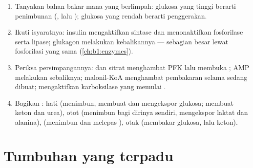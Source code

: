 \begin{method}\label{met:b1:biosyntheses-integration:state}
\begin{enumerate}
  \item Tanyakan bahan bakar mana yang berlimpah: glukosa yang tinggi
        berarti penimbunan (, lalu ); glukosa yang rendah
        berarti penggerakan.
  \item Ikuti isyaratnya: insulin mengaktifkan sintase dan
        menonaktifkan fosforilase serta lipase; glukagon melakukan
        kebalikannya --- sebagian besar lewat fosforilasi  yang sama
        (\cref{ch:b1:enzymes}).
  \item Periksa persimpangannya:  dan sitrat menghambat PFK lalu
        membuka ; AMP melakukan sebaliknya; malonil-KoA
        menghambat pembakaran  selama  sedang dibuat;
         mengaktifkan karboksilase yang memulai
        .
  \item Bagikan : hati (menimbun, membuat dan mengekspor
        glukosa; membuat keton dan urea), otot (menimbun  bagi
        dirinya sendiri, mengekspor laktat dan alanina),  
        (menimbun dan melepas ), otak (membakar glukosa, lalu
        keton).
\end{enumerate}
\end{method}

\section{Tumbuhan yang terpadu}

